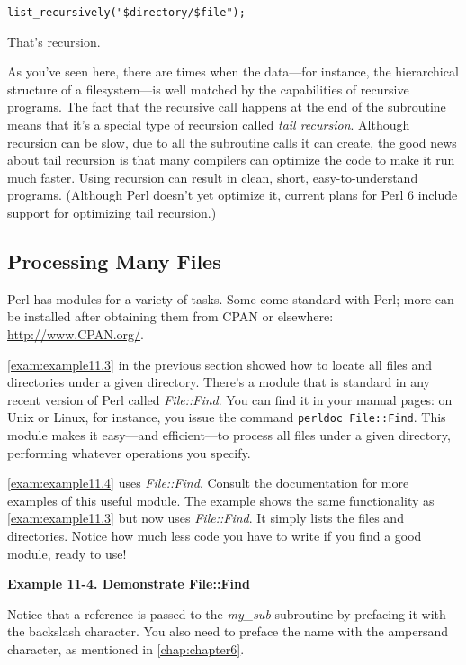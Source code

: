 \begin{lstlisting}
list_recursively("$directory/$file");
\end{lstlisting}

That's recursion.

As you've seen here, there are times when the data—for instance, the hierarchical structure of a filesystem—is well matched by the capabilities of recursive programs. The fact that the recursive call happens at the end of the subroutine means that it's a special type of recursion called \textit{tail recursion}. Although recursion can be slow, due to all the subroutine calls it can create, the good news about tail recursion is that many compilers can optimize the code to make it run much faster. Using recursion can result in clean, short, easy-to-understand programs. (Although Perl doesn't yet optimize it, current plans for Perl 6 include support for optimizing tail recursion.) 

\subsection{Processing Many Files}
Perl has modules for a variety of tasks. Some come standard with Perl; more can be installed after obtaining them from CPAN or elsewhere: \href{http://www.CPAN.org/}{http://www.CPAN.org/}.

\autoref{exam:example11.3} in the previous section showed how to locate all files and directories under a given directory. There's a module that is standard in any recent version of Perl called \textit{File::Find}. You can find it in your manual pages: on Unix or Linux, for instance, you issue the command \verb|perldoc File::Find|. This module makes it easy—and efficient—to process all files under a given directory, performing whatever operations you specify.

\autoref{exam:example11.4} uses \textit{File::Find}. Consult the documentation for more examples of this useful module. The example shows the same functionality as \autoref{exam:example11.3} but now uses \textit{File::Find}. It simply lists the files and directories. Notice how much less code you have to write if you find a good module, ready to use! 

\textbf{Example 11-4. Demonstrate File::Find}


Notice that a reference is passed to the \textit{my\_sub} subroutine by prefacing it with the backslash character. You also need to preface the name with the ampersand character, as mentioned in \autoref{chap:chapter6}.

